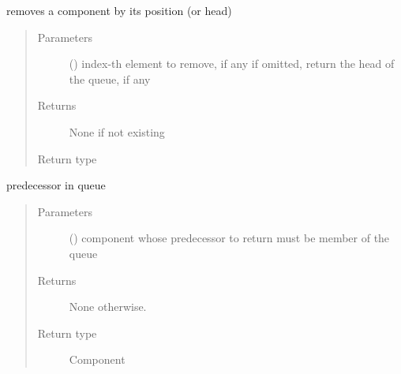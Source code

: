 \documentclass[letterpaper,10pt,english]{sphinxmanual}
\begin{document}
\begin{fulllineitems}

\begin{fulllineitems}
\label{\detokenize{Reference:salabim.Queue.pop}}
removes a component by its position (or head)
\begin{quote}\begin{description}
\item[{Parameters}] \leavevmode
{} () \textendash{} index-th element to remove, if any 
if omitted, return the head of the queue, if any

\item[{Returns}] \leavevmode
{} \textendash{} None if not existing

\item[{Return type}] \leavevmode
{\hyperref[\detokenize{Reference:salabim.Component}]{}}

\end{description}\end{quote}

\end{fulllineitems}


\begin{fulllineitems}
\label{\detokenize{Reference:salabim.Queue.predecessor}}
predecessor in queue
\begin{quote}\begin{description}
\item[{Parameters}] \leavevmode
{} ({\hyperref[\detokenize{Reference:salabim.Component}]{}}) \textendash{} component whose predecessor to return 
must be member of the queue

\item[{Returns}] \leavevmode
{} \textendash{} None otherwise.

\item[{Return type}] \leavevmode
Component 

\end{description}\end{quote}


\end{fulllineitems}
\end{fulllineitems}
\end{document}
